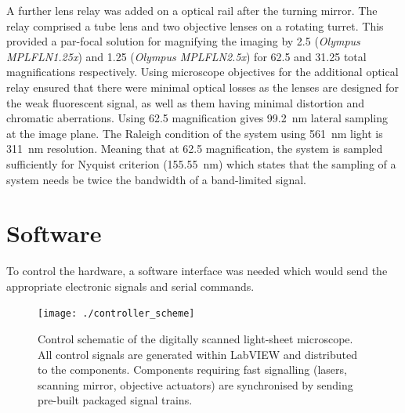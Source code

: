 A further lens relay was added on a optical rail after the turning mirror.
The relay comprised a tube lens and two objective lenses on a rotating turret.
This provided a par-focal solution for magnifying the imaging by \SI{2.5}{\times} (\emph{Olympus MPLFLN1.25x}) and \SI{1.25}{\times} (\emph{Olympus MPLFLN2.5x}) for \SI{62.5}{\times} and \SI{31.25}{\times} total magnifications respectively.
Using microscope objectives for the additional optical relay ensured that there were minimal optical losses as the lenses are designed for the weak fluorescent signal, as well as them having minimal distortion and chromatic aberrations.
Using \SI{62.5}{\times} magnification gives \SI{99.2}{\nano\meter} lateral sampling at the image plane.
The Raleigh condition of the system using \SI{561}{\nano\meter} light is \SI{311}{\nano\meter} resolution.
Meaning that at \SI{62.5}{\times} magnification, the system is sampled sufficiently for Nyquist criterion (\SI{155.55}{\nano\meter}) which states that the sampling of a system needs be twice the bandwidth of a band-limited signal.
\section{Software}

To control the hardware, a software interface was needed which would send the appropriate electronic signals and serial commands.

\begin{figure}
    \centering
  \texttt{[image: ./controller\_scheme]} %
  \caption{Control schematic of the digitally scanned light-sheet microscope.
  All control signals are generated within LabVIEW and distributed to the components.
  Components requiring fast signalling (lasers, scanning mirror, objective actuators) are synchronised by sending pre-built packaged signal trains.}
  \label{fig:control}
\end{figure}



